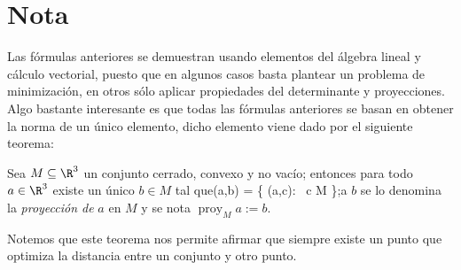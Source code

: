 \documentclass[11pt,a4paper]{article} %
\DeclareMathOperator{\proy}{proy}
\DeclareMathOperator{\dd}{d}
\begin{document}
\section*{Nota}
Las fórmulas anteriores se demuestran usando elementos del álgebra lineal y cálculo vectorial, puesto que en algunos casos basta plantear un problema de minimización, en otros sólo aplicar propiedades del determinante y proyecciones. Algo bastante interesante es que todas las fórmulas anteriores se basan en obtener la norma de un único elemento, dicho elemento viene dado por el siguiente teorema:
\begin{teo}
Sea \(M \subseteq \R^3\) un conjunto cerrado, convexo y no vacío; entonces para todo \(a\in \R^3\) existe un único \(b\in M\) tal que$$\dd (a,b) = \inf\big\{ \dd(a,c): \, c \in M  \big\};\]a \(b\) se lo denomina la \emph{proyección de} \(a\) en \(M\) y se nota \( \proy_M a := b\).\end{teo}
Notemos que este teorema nos permite afirmar que siempre existe un punto que optimiza la distancia entre un conjunto y otro punto.
\end{document}
